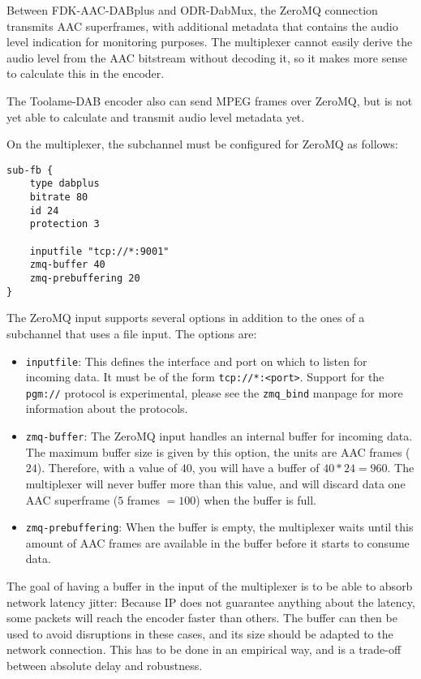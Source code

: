 Between FDK-AAC-DABplus and ODR-DabMux, the ZeroMQ connection transmits AAC superframes, with
additional metadata that contains the audio level indication for monitoring purposes. The
multiplexer cannot easily derive the audio level from the AAC bitstream without decoding it, so it
makes more sense to calculate this in the encoder.

The Toolame-DAB encoder also can send MPEG frames over ZeroMQ, but is not yet able to calculate and
transmit audio level metadata yet.

On the multiplexer, the subchannel must be configured for ZeroMQ as follows:
\begin{lstlisting}
sub-fb {
    type dabplus
    bitrate 80
    id 24
    protection 3

    inputfile "tcp://*:9001"
    zmq-buffer 40
    zmq-prebuffering 20
}
\end{lstlisting}

The ZeroMQ input supports several options in addition to the ones of a subchannel that uses a file
input. The options are:

\begin{itemize}
    \item \texttt{inputfile}: This defines the interface and port on which to listen for incoming
        data. It must be of the form \texttt{tcp://*:<port>}. Support for the \texttt{pgm://}
        protocol is experimental, please see the \texttt{zmq\_bind} manpage for more information
        about the protocols.
    \item \texttt{zmq-buffer}: The ZeroMQ input handles an internal buffer for incoming data. The
        maximum buffer size is given by this option, the units are AAC frames ($24$\ms). Therefore,
        with a value of $40$, you will have a buffer of $40 * 24 = 960$\ms. The multiplexer will
        never buffer more than this value, and will discard data one AAC superframe
        ($5$ frames $= 100$\ms) when the buffer is full.
    \item \texttt{zmq-prebuffering}: When the buffer is empty, the multiplexer waits until this
        amount of AAC frames are available in the buffer before it starts to consume data.
\end{itemize}

The goal of having a buffer in the input of the multiplexer is to be able to absorb network latency
jitter: Because IP does not guarantee anything about the latency, some packets will reach the
encoder faster than others. The buffer can then be used to avoid disruptions in these cases, and its
size should be adapted to the network connection. This has to be done in an empirical way, and is a
trade-off between absolute delay and robustness.

